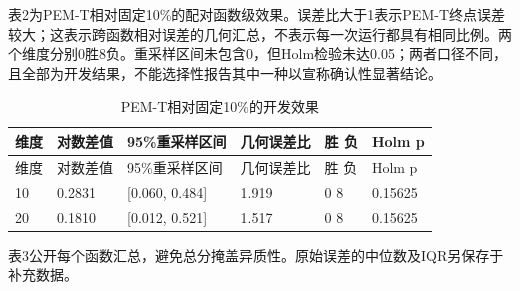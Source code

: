 \documentclass[11pt,a4paper]{article}
\begin{document}
表2为PEM-T相对固定10\%的配对函数级效果。误差比大于1表示PEM-T终点误差较大；这表示跨函数相对误差的几何汇总，不表示每一次运行都具有相同比例。两个维度分别0胜8负。重采样区间未包含0，但Holm检验未达0.05；两者口径不同，且全部为开发结果，不能选择性报告其中一种以宣称确认性显著结论。

\par\noindent\begin{minipage}{\linewidth}

\begin{longtable}[]{@{}llllll@{}}
\caption{PEM-T相对固定10\%的开发效果}\tabularnewline
\toprule
维度 & 对数差值 & 95\%重采样区间 & 几何误差比 & 胜 负 & Holm p \\
\midrule
\endfirsthead
\toprule
维度 & 对数差值 & 95\%重采样区间 & 几何误差比 & 胜 负 & Holm p \\
\midrule
\endhead
10 & 0.2831 & {[}0.060, 0.484{]} & 1.919 & 0 8 & 0.15625 \\
20 & 0.1810 & {[}0.012, 0.521{]} & 1.517 & 0 8 & 0.15625 \\
\bottomrule
\end{longtable}

\end{minipage}\par

表3公开每个函数汇总，避免总分掩盖异质性。原始误差的中位数及IQR另保存于补充数据。

\begingroup\small
\end{document}
